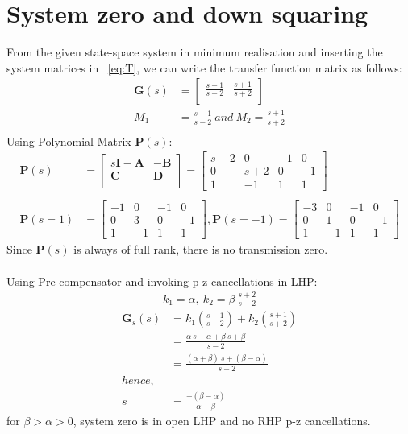 \documentclass{scrreprt}
\begin{document}
\section{System zero and down squaring}
From the given state-space system in minimum realisation and inserting the system matrices in ~\eqref{eq:T}, we can write the transfer function matrix as follows:
\begin{align*}
\bm{G}(s)&=
\begin{bmatrix}
\frac{s - 1}{s - 2} & \frac{s + 1}{s + 2} \\
\end{bmatrix}\\
M_1 &= \frac{s - 1}{s - 2} \: and \: M_2 = \frac{s + 1}{s + 2} \\
\end{align*}
Using Polynomial Matrix $\bm{P}(s)$: \\
\begin{align*}
\bm{P}(s) &=
\begin{bmatrix}
s\bm{I}-\bm{A} & -\bm{B} \\
\bm{C} & \bm{D} \\
\end{bmatrix}
=
\begin{bmatrix}
s - 2 & 0 & -1 & 0 \\
0 & s + 2 & 0 & -1 \\
1 & -1 & 1 & 1
\end{bmatrix} \\
\\
\bm{P}(s=1) &=
\begin{bmatrix}
 -1 & 0 & -1 & 0 \\
0 & 3 & 0 & -1 \\
1 & -1 & 1 & 1
\end{bmatrix},
\bm{P}(s=-1) =
\begin{bmatrix}
 -3 & 0 & -1 & 0 \\
0 & 1 & 0 & -1 \\
1 & -1 & 1 & 1
\end{bmatrix}
\end{align*}
Since  $\bm{P}(s)$ is always of full rank, there is no transmission zero. \\
\\
Using Pre-compensator and invoking p-z cancellations in LHP:\\
\begin{align*}
k_1 = \alpha, \: k_2 = \beta\:\frac{s+2}{s-2}
\end{align*}
\begin{align*}
\bm{G}_{s}(s) &= k_1(\frac{s-1}{s-2}) + k_2(\frac{s+1}{s+2}) \\
	&= \frac{\alpha\:s - \alpha + \beta\:s + \beta}{s-2} \\
	&= \frac{(\alpha + \beta)\:s + (\beta-\alpha)}{s-2} \\
hence,\\
s &= \frac{-(\beta-\alpha)}{\alpha+\beta}
\end{align*}
for $\beta>\alpha>0$, system zero is in open LHP and no RHP p-z cancellations.
\end{document}
